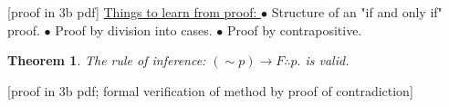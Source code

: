 \documentclass{article}
\newtheorem{theorem}{Theorem}                                       %
\begin{document}
[proof in 3b pdf]
\newline
\newline
\underline{Things to learn from proof: }
\newline 
$\bullet $ Structure of an "if and only if" proof.
\newline
$\bullet $ Proof by division into cases.
\newline
$\bullet $ Proof by contrapositive.
\newline
{}
\newline
\newline
\begin{theorem}
  The rule of inference: $(\sim p) \longrightarrow F \therefore p.$ is valid.
\end{theorem}
[proof in 3b pdf; formal verification of method by proof of contradiction]
\newline
{}
\newpage
\end{document}
